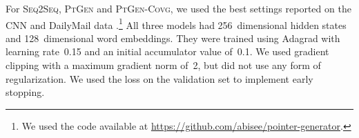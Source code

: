 
For \textsc{Seq2Seq}, \textsc{PtGen} and \textsc{PtGen-Covg}, we used
the best settings reported on the CNN and DailyMail data
\cite{see-acl17}.\footnote{We used the code available at
  \url{https://github.com/abisee/pointer-generator}.}  All three
models had 256~dimensional hidden states and 128~dimensional word
embeddings. They were trained using Adagrad \cite{Duchi:2011} with
learning rate~0.15 and an initial accumulator value of~0.1. We used
gradient clipping with a maximum gradient norm of~2, but did not use
any form of regularization.  We used the loss on the validation set to
implement early stopping. 

\begin{table}[t!]
  \caption{Example topics learned by the LDA model on XSum documents
(training portion).}\label{fig:lda-topics}
\end{table}

